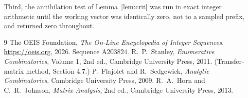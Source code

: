 \documentclass[11pt,a4paper]{article}
\theoremstyle{plain}
\theoremstyle{definition}
\begin{document}
Third, the annihilation test of Lemma~\ref{lem:crit} was run in exact integer arithmetic
until the working vector was identically zero, not to a sampled prefix, and returned zero
throughout.

\begin{thebibliography}{9}
 The OEIS Foundation, \emph{The On-Line Encyclopedia of Integer
Sequences}, \url{https://oeis.org}, 2026. Sequence A203824.
 R.~P.~Stanley, \emph{Enumerative Combinatorics}, Volume 1, 2nd ed.,
Cambridge University Press, 2011. (Transfer-matrix method, Section 4.7.)
 P.~Flajolet and R.~Sedgewick, \emph{Analytic Combinatorics}, Cambridge
University Press, 2009.
 R.~A.~Horn and C.~R.~Johnson, \emph{Matrix Analysis}, 2nd ed., Cambridge
University Press, 2013.
\end{thebibliography}
\end{document}
